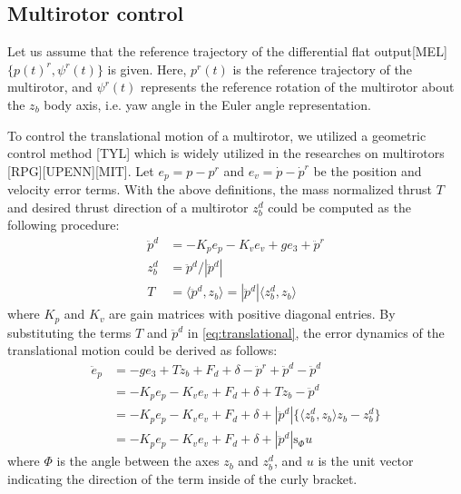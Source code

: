 \documentclass[letterpaper, 10 pt, conference]{ieeeconf}  %
\begin{document}
\subsection{Multirotor control} \label{sec:controller}
Let us assume that the reference trajectory of the differential flat output[MEL] $\{p(t)^r,\psi^r(t)\}$ is given.
Here, $p^r(t)$ is the reference trajectory of the multirotor, and $\psi^r(t)$ represents the reference rotation of the multirotor about the $z_b$ body axis, i.e. yaw angle in the Euler angle representation.

To control the translational motion of a multirotor, we utilized a geometric control method [TYL] which is widely utilized in the researches on multirotors [RPG][UPENN][MIT].
Let $e_p = p - p^r$ and $e_v = \dot{p} - \dot{p}^r$ be the position and velocity error terms.
With the above definitions, the mass normalized thrust $T$ and desired thrust direction of a multirotor $z_b^d$ could be computed as the following procedure:
\begin{align}
\ddot{p}^{d} &= -K_p e_p - K_v e_v + ge_3 + \ddot{p}^r \label{eq:ddpd} \\
z_b^{d} &= \ddot{p}^{d}/|\ddot{p}^{d}| \nonumber \\
T &= \langle \ddot{p}^{d}, z_b \rangle = |\ddot{p}^{d}|\langle z_b^d, z_b \rangle \nonumber 
\end{align}
where $K_p$ and $K_v$ are gain matrices with positive diagonal entries.
By substituting the terms $T$ and $\ddot{p}^d$ in \eqref{eq:translational}, the error dynamics of the translational motion could be derived as follows:
\begin{align}
\ddot{e}_p &= -ge_3 + Tz_b + F_d + \delta - \ddot{p}^r + \ddot{p}^d - \ddot{p}^d \nonumber \\
&= -K_pe_p -K_ve_v + F_d + \delta + Tz_b - \ddot{p}^d \nonumber \\
&= -K_pe_p -K_ve_v + F_d + \delta + |\ddot{p}^d|\{\langle z_b^d, z_b \rangle z_b - z_b^d\} \nonumber \\
&= -K_pe_p -K_ve_v + F_d + \delta +  |\ddot{p}^d|\text{s}_\Phi u \label{eq:translationalError1}
\end{align}
where $\Phi$ is the angle between the axes $z_b$ and $z_b^d$, and $u$ is the unit vector indicating the direction of the term inside of the curly bracket.
\end{document}
